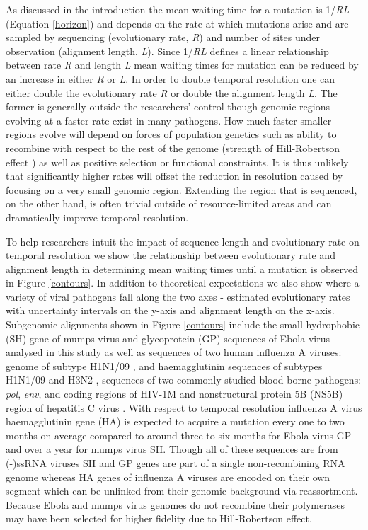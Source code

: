 \documentclass{bmcart}
\begin{document}
As discussed in the introduction the mean waiting time for a mutation is 1/\textit{RL} (Equation \ref{horizon}) and depends on the rate at which mutations arise and are sampled by sequencing (evolutionary rate, \textit{R}) and number of sites under observation (alignment length, \textit{L}).
Since 1/\textit{RL} defines a linear relationship between rate \textit{R} and length \textit{L} mean waiting times for mutation can be reduced by an increase in either \textit{R} or \textit{L}.
In order to double temporal resolution one can either double the evolutionary rate \textit{R} or double the alignment length \textit{L}.
The former is generally outside the researchers' control though genomic regions evolving at a faster rate exist in many pathogens.
How much faster smaller regions evolve will depend on forces of population genetics such as ability to recombine with respect to the rest of the genome (strength of Hill-Robertson effect \cite{hill_effect_1966}) as well as positive selection or functional constraints.
It is thus unlikely that significantly higher rates will offset the reduction in resolution caused by focusing on a very small genomic region.
Extending the region that is sequenced, on the other hand, is often trivial outside of resource-limited areas and can dramatically improve temporal resolution.

To help researchers intuit the impact of sequence length and evolutionary rate on temporal resolution we show the relationship between evolutionary rate and alignment length in determining mean waiting times until a mutation is observed in Figure \ref{contours}.
In addition to theoretical expectations we also show where a variety of viral pathogens fall along the two axes - estimated evolutionary rates with uncertainty intervals on the y-axis and alignment length on the x-axis.
Subgenomic alignments shown in Figure \ref{contours} include the small hydrophobic (SH) gene of mumps virus \cite{cui_evolutionary_2017} and glycoprotein (GP) sequences of Ebola virus analysed in this study as well as sequences of two human influenza A viruses: genome of subtype H1N1/09 \cite{hedge_real-time_2013}, and haemagglutinin sequences of subtypes H1N1/09 \cite{smith_origins_2009} and H3N2 \cite{rambaut_genomic_2008}, sequences of two commonly studied blood-borne pathogens: \textit{pol}, \textit{env}, and coding regions of HIV-1M \cite{patino-galindo_substitution_2017} and nonstructural protein 5B (NS5B) region of hepatitis C virus \cite{magiorkinis_global_2009}.
With respect to temporal resolution influenza A virus haemagglutinin gene (HA) is expected to acquire a mutation every one to two months on average compared to around three to six months for Ebola virus GP and over a year for mumps virus SH.
Though all of these sequences are from (-)ssRNA viruses SH and GP genes are part of a single non-recombining RNA genome \cite{chare_phylogenetic_2003} whereas HA genes of influenza A viruses are encoded on their own segment which can be unlinked from their genomic background via reassortment.
Because Ebola and mumps virus genomes do not recombine their polymerases may have been selected for higher fidelity due to Hill-Robertson effect.
\end{document}

